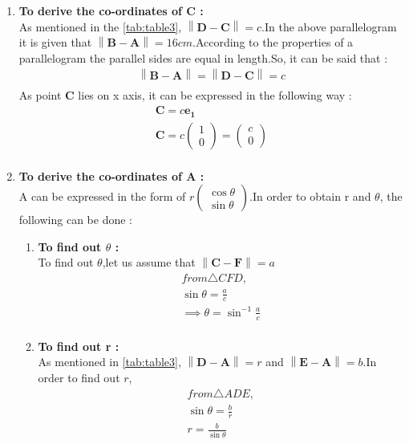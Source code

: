 \documentclass{article}
\providecommand{\norm}[1]{\left\lVert#1\right\rVert}
\newcommand{\myvec}[1]{\ensuremath{\begin{pmatrix}#1\end{pmatrix}}}
\let\vec\mathbf
\begin{document}
\begin{enumerate}
	\item \textbf{To derive the co-ordinates of C :}\\
		As mentioned in the \ref{tab:table3}, $\norm{\vec{D} - \vec{C}} = c$.In the above parallelogram it is given that $\norm{\vec{B} - \vec{A}} = 16cm$.According to the properties of a parallelogram the parallel sides are equal in length.So, it can be said that : \\
		\begin{align}
			\norm{\vec{B} - \vec{A}} = \norm{\vec{D} - \vec{C}} = c\\
		\end{align}
As point $\vec{C}$ lies on x axis, it can be expressed in the following way :\\
		\begin{align}
			\vec{C} = c\vec{e_1}\\
			\vec{C} = c\myvec{1\\0} = \myvec{c\\0}\\
		\end{align}
	\item \textbf{To derive the co-ordinates of A :}\\
		A can be expressed in the form of $r\myvec{\cos{\theta}\\\sin{\theta}}$.In order to obtain r and $\theta$, the following can be done : \\
		\begin{enumerate}
			\item \textbf{To find out $\theta$ :}\\
		To find out $\theta$,let us assume that $\norm{\vec{C} - \vec{F}} = a$		
		\begin{align}
			from \triangle{CFD},\\
			\sin{\theta} = \frac{a}{c}\\
			\implies \theta = \sin^{-1}{\frac{a}{c}} \\
		\end{align}
	\item \textbf{To find out r :}\\
		As mentioned in \ref{tab:table3}, $\norm{\vec{D} - \vec{A}} = r$ and $\norm{\vec{E} - \vec{A}} = b$.In order to find out $r$,
		\begin{align}
			from \triangle{ADE},\\
			\sin{\theta} = \frac{b}{r}\\
			r = \frac{b}{\sin{\theta}}\\

\end{align}
\end{enumerate}
\end{enumerate}
\end{document}
